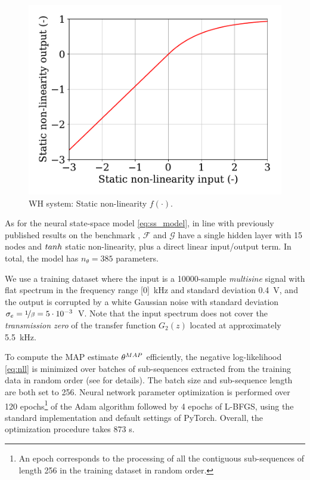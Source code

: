\documentclass{ifacconf}
\newcommand{\MAP}{{\rm MAP}}
\begin{document}
\begin{figure}
 \centering
 \includegraphics[width=.5\linewidth]{img/wh_static.pdf}
 \caption{WH system: Static non-linearity $f(\cdot)$.}
 \label{fig:wh_static}
\end{figure}

As for the neural state-space model \eqref{eq:ss_model}, in line with previously published results on the benchmark \citep{beintema2021nonlinear}, $\mathcal{F}$ and $\mathcal{G}$ have a single hidden layer with 15 nodes and $\rm tanh$ static non-linearity, plus a direct linear input/output term. In total, the model has $n_\theta=385$ parameters.

We use a training dataset where the input is a 10000-sample \emph{multisine} signal with flat spectrum 
in the frequency range [0]~kHz and standard deviation 0.4~V, and the output is corrupted by a white Gaussian noise with standard deviation $\sigma_e=\nicefrac{1}{\beta}=5 \cdot 10^{-3}$~V. Note that the input spectrum does not cover the \emph{transmission zero} of the transfer function $G_2(z)$ located at approximately 5.5~kHz.

To compute the MAP estimate $\theta^\MAP$ efficiently, the negative log-likelihood \eqref{eq:nll} is minimized over batches of sub-sequences extracted from the training data in random order (see \citep{forgione2020model} for details). The batch size and sub-sequence length are both set to 256. 
Neural network parameter optimization is performed over 120 epochs\footnote{An epoch corresponds to the processing of all the contiguous sub-sequences of length 256 in the training dataset in random order.} of the Adam algorithm followed by 4 epochs of L-BFGS, using the standard implementation and default settings of PyTorch. Overall, the optimization procedure takes 873 s.
\end{document}

